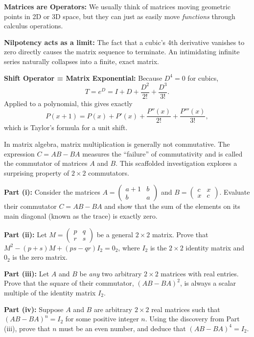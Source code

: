 \begin{takeaways}
\item \textbf{Matrices are Operators:} We usually think of matrices moving geometric points in 2D or 3D space, but they can just as easily move \textit{functions} through calculus operations.
\item \textbf{Nilpotency acts as a limit:} The fact that a cubic's 4th derivative vanishes to zero directly causes the matrix sequence to terminate. An intimidating infinite series naturally collapses into a finite, exact matrix.
\item \textbf{Shift Operator = Matrix Exponential:} Because $D^4=0$ for cubics,
\[
T=e^D=I+D+\frac{D^2}{2!}+\frac{D^3}{3!}.
\]
Applied to a polynomial, this gives exactly
\[
P(x+1)
=P(x)+P'(x)+\frac{P''(x)}{2!}
+\frac{P'''(x)}{3!},
\]
which is Taylor's formula for a unit shift.
\end{takeaways}

\begin{problem}
In matrix algebra, matrix multiplication is generally not commutative. The expression $C = AB - BA$ measures the ``failure'' of commutativity and is called the commutator of matrices $A$ and $B$. This scaffolded investigation explores a surprising property of $2 \times 2$ commutators.

\textbf{Part (i):} Consider the matrices $A = \begin{pmatrix} a+1 & b \\ b & a \end{pmatrix}$ and $B = \begin{pmatrix} c & x \\ x & c \end{pmatrix}$. Evaluate their commutator $C = AB - BA$ and show that the sum of the elements on its main diagonal (known as the trace) is exactly zero.

\textbf{Part (ii):} Let $M = \begin{pmatrix} p & q \\ r & s \end{pmatrix}$ be a general $2 \times 2$ matrix. Prove that $M^2 - (p+s)M + (ps-qr)I_2 = 0_2$, where $I_2$ is the $2 \times 2$ identity matrix and $0_2$ is the zero matrix.

\textbf{Part (iii):} Let $A$ and $B$ be \textit{any} two arbitrary $2 \times 2$ matrices with real entries. Prove that the square of their commutator, $(AB - BA)^2$, is always a scalar multiple of the identity matrix $I_2$.

\textbf{Part (iv):} Suppose $A$ and $B$ are arbitrary $2 \times 2$ real matrices such that $(AB - BA)^n = I_2$ for some positive integer $n$. Using the discovery from Part (iii), prove that $n$ must be an even number, and deduce that $(AB - BA)^4 = I_2$.
\end{problem}

